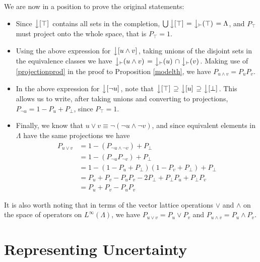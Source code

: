 We are now in a position to prove the original statements:
\begin{itemize}
\item Since $\left\downarrow[\top]\right.$ contains all sets in the completion, $\bigcup\left\downarrow[\top]\right. = \left\downarrow_\vdash(\top)\right. = \Lambda$, and $P_\top$ must project onto the whole space, that is $P_\top = 1$.
\item Using the above expression for $\left\downarrow[u \land v]\right.$, taking unions of the disjoint sets in the equivalence classes we have $\left\downarrow_\vdash(u\land v)\right. = \left\downarrow_\vdash(u)\right. \cap \left\downarrow_\vdash(v)\right.$. Making use of \eqref{projectionprod} in the proof to Proposition \ref{modelth}, we have $P_{u\land v} = P_uP_v$.
\item In the above expression for $\left\downarrow[\lnot u]\right.$, note that $\left\downarrow[\top]\right. \supseteq \left\downarrow[u]\right. \supseteq{\left\downarrow[\bot]\right.}$. This allows us to write, after taking unions and converting to projections, $P_{\lnot u} = 1 - P_u + P_\bot$, since $P_\top = 1$.
\item Finally, we know that $u\lor v \equiv \lnot(\lnot u \land \lnot v)$, and since equivalent elements in $\Lambda$ have the same projections we have
\begin{align*}
P_{u\lor v} &= 1 - (P_{\lnot u \land \lnot v}) + P_\bot\\
		&= 1 - (P_{\lnot u}P_{\lnot v}) + P_\bot\\
		&= 1 - (1 - P_u + P_\bot)(1 - P_v + P_\bot) + P_\bot\\
		&= P_u + P_v - P_u P_v - 2P_\bot + P_\bot P_u + P_\bot P_v\\
		&= P_u + P_v - P_u P_v
\end{align*}
\end{itemize}

It is also worth noting that in terms of the vector lattice operations $\lor$ and $\land$ on the space of operators on $L^\infty(\Lambda)$, we have $P_{u\lor v} = P_u \lor P_v$ and $P_{u\land v} = P_u \land P_v$.


\section{Representing Uncertainty}
\label{uncertainty-section}

